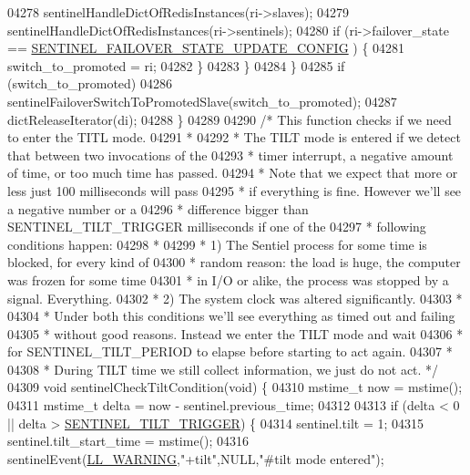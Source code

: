 \begin{DoxyCode}
{{{{{{{{{{{{{{{{{{{{{{{{{{{{{{{{{{{{{{{{{{{{{{{{{{{{{{{{{{{{{{{{{{{{{{{{{{{{{{{{{{{{{{{{{{{{{{{{{{{{{{04278             sentinelHandleDictOfRedisInstances(ri->slaves);
04279             sentinelHandleDictOfRedisInstances(ri->sentinels);
04280             \textcolor{keywordflow}{if} (ri->failover\_state == \hyperlink{sentinel_8c_a2b6f5592dea88534b287c71e46181ed3}{SENTINEL\_FAILOVER\_STATE\_UPDATE\_CONFIG}
      ) \{
04281                 switch\_to\_promoted = ri;
04282             \}
04283         \}
04284     \}
04285     \textcolor{keywordflow}{if} (switch\_to\_promoted)
04286         sentinelFailoverSwitchToPromotedSlave(switch\_to\_promoted);
04287     dictReleaseIterator(di);
04288 \}
04289 
04290 \textcolor{comment}{/* This function checks if we need to enter the TITL mode.}
04291 \textcolor{comment}{ *}
04292 \textcolor{comment}{ * The TILT mode is entered if we detect that between two invocations of the}
04293 \textcolor{comment}{ * timer interrupt, a negative amount of time, or too much time has passed.}
04294 \textcolor{comment}{ * Note that we expect that more or less just 100 milliseconds will pass}
04295 \textcolor{comment}{ * if everything is fine. However we'll see a negative number or a}
04296 \textcolor{comment}{ * difference bigger than SENTINEL\_TILT\_TRIGGER milliseconds if one of the}
04297 \textcolor{comment}{ * following conditions happen:}
04298 \textcolor{comment}{ *}
04299 \textcolor{comment}{ * 1) The Sentiel process for some time is blocked, for every kind of}
04300 \textcolor{comment}{ * random reason: the load is huge, the computer was frozen for some time}
04301 \textcolor{comment}{ * in I/O or alike, the process was stopped by a signal. Everything.}
04302 \textcolor{comment}{ * 2) The system clock was altered significantly.}
04303 \textcolor{comment}{ *}
04304 \textcolor{comment}{ * Under both this conditions we'll see everything as timed out and failing}
04305 \textcolor{comment}{ * without good reasons. Instead we enter the TILT mode and wait}
04306 \textcolor{comment}{ * for SENTINEL\_TILT\_PERIOD to elapse before starting to act again.}
04307 \textcolor{comment}{ *}
04308 \textcolor{comment}{ * During TILT time we still collect information, we just do not act. */}
04309 \textcolor{keywordtype}{void} sentinelCheckTiltCondition(\textcolor{keywordtype}{void}) \{
04310     mstime\_t now = mstime();
04311     mstime\_t delta = now - sentinel.previous\_time;
04312 
04313     \textcolor{keywordflow}{if} (delta < 0 || delta > \hyperlink{sentinel_8c_a717cd21c21357abdd371151e3d18c98a}{SENTINEL\_TILT\_TRIGGER}) \{
04314         sentinel.tilt = 1;
04315         sentinel.tilt\_start\_time = mstime();
04316         sentinelEvent(\hyperlink{server_8h_a31229b9334bba7d6be2a72970967a14b}{LL\_WARNING},\textcolor{stringliteral}{"+tilt"},NULL,\textcolor{stringliteral}{"#tilt mode entered"});
}}}}}}}}}}}}}}}}}}}}}}}}}}}}}}}}}}}}}}}}}}}}}}}}}}}}}}}}}}}}}}}}}}}}}}}}}}}}}}}}}}}}}}}}}}}}}}}}}}}}}}
\end{DoxyCode}
